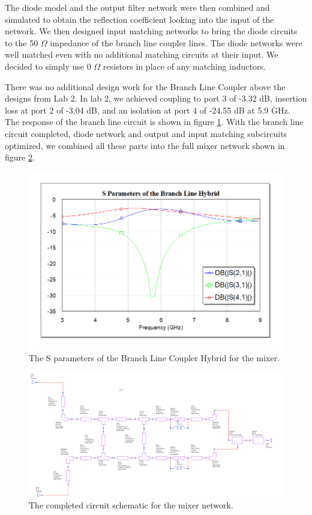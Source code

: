 \documentclass[twocolumn, aps, floatfix]{revtex4-1}
\begin{document}
The diode model and the output filter network were then combined and simulated to obtain the reflection coefficient looking into the input of the network. We then designed input matching networks to bring the diode circuits to the 50 $\Omega$ impedance of the branch line coupler lines. The diode networks were well matched even with no additional matching circuits at their input. We decided to simply use 0 $\Omega$ resistors in place of any matching inductors.

There was no additional design work for the Branch Line Coupler above the designs from Lab 2. In lab 2, we achieved coupling to port 3 of -3.32 dB, insertion loss at port 2 of -3.04 dB, and an isolation at port 4 of -24.55 dB at 5.9 GHz. The response of the branch line circuit is shown in figure \ref{fig:branchparams}. With the branch line circuit completed, diode network and output and input matching subcircuits optimized, we combined all these parts into the full mixer network shown in figure \ref{fig:fullcircuit}.


\begin{figure}[!htbp]
    \includegraphics[scale=0.4]{BranchLine_Sparams.png}
    \caption{The S parameters of the Branch Line Coupler Hybrid for the mixer.}
    \label{fig:branchparams}
\end{figure}

\begin{figure}[!htbp]
    \includegraphics[scale=0.46]{full_circuit.png}
    \caption{The completed circuit schematic for the mixer network.}
    \label{fig:fullcircuit}
\end{figure}
\end{document}
